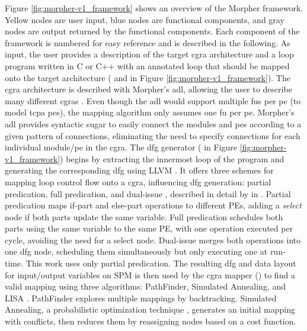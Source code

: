     Figure \ref{fig:morpher-v1_framework} shows an overview of the Morpher framework.
    Yellow nodes are user input, blue nodes are functional components, and gray nodes are output returned by the functional components.
    Each component of the framework is numbered for easy reference and is described in the following.
    As input, the user provides a description of the target \ac{cgra} architecture and a loop program written in C or C++ with an annotated loop that should be mapped onto the target architecture ( and  in Figure \ref{fig:morpher-v1_framework}).
    The \ac{cgra} architecture is described with Morpher's \ac{adl}, allowing the user to describe many different \acp{cgra} \cite{6_MorpherWOSET}.
    Even though the \ac{adl} would support multiple \acp{fu} per \ac{pe} (to model \ac{tcpa} \acp{pe}), the mapping algorithm only assumes one \ac{fu} per \ac{pe}. 
    Morpher's \ac{adl} provides syntactic sugar to easily connect the modules and \acp{pe} according to a given pattern of connections, eliminating the need to specify connections for each individual module/\ac{pe} in the \ac{cgra}.
    The \ac{dfg} generator ( in Figure \ref{fig:morpher-v1_framework}) begins by extracting the innermost loop of the program and generating the corresponding \ac{dfg} using LLVM \cite{LLVM}.
    It offers three schemes for mapping loop control flow onto a \ac{cgra}, influencing \ac{dfg} generation: partial predication, full predication, and dual-issue \cite{6_MorpherWOSET}, described in detail by in \cite{8_Branch_aware_loop_mapping}.
%
    Partial predication maps if-part and else-part operations to different PEs, adding a \textit{select} node if both parts update the same variable.
    Full predication schedules both parts using the same variable to the same PE, with one operation executed per cycle, avoiding the need for a select node.
    Dual-issue merges both operations into one \ac{dfg} node, scheduling them simultaneously but only executing one at run-time.
    This work uses only partial predication.
    The resulting \ac{dfg} and data layout for input/output variables on SPM is then used by the \ac{cgra} mapper () to find a valid mapping using three algorithms: PathFinder, Simulated Annealing, and LISA \cite{6_MorpherWOSET,morpher}.
    PathFinder explores multiple mappings by backtracking.
    Simulated Annealing, a probabilistic optimization technique \cite{32_SA}, generates an initial mapping with conflicts, then reduces them by reassigning nodes based on a cost function.
